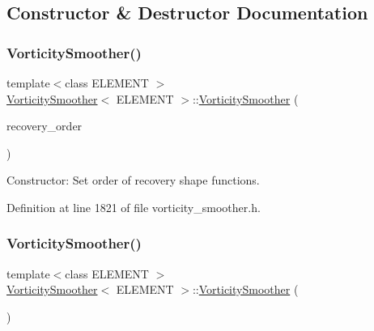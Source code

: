 \subsection{Constructor \& Destructor Documentation}
\mbox{\label{classVorticitySmoother_ae1c778ccf80298ff06ed89f581956b70}} 
\subsubsection{\texorpdfstring{Vorticity\+Smoother()}{VorticitySmoother()}\hspace{0.1cm}{\footnotesize\ttfamily [1/2]}}
{\footnotesize\ttfamily template$<$class E\+L\+E\+M\+E\+NT $>$ \\
\hyperlink{classVorticitySmoother}{Vorticity\+Smoother}$<$ E\+L\+E\+M\+E\+NT $>$\+::\hyperlink{classVorticitySmoother}{Vorticity\+Smoother} (\begin{DoxyParamCaption}\item[{const unsigned \&}]{recovery\+\_\+order }\end{DoxyParamCaption})\hspace{0.3cm}{\ttfamily [inline]}}



Constructor\+: Set order of recovery shape functions. 



Definition at line 1821 of file vorticity\+\_\+smoother.\+h.

\mbox{\label{classVorticitySmoother_a398982f6cd71421234850d34bed3e06f}} 
\subsubsection{\texorpdfstring{Vorticity\+Smoother()}{VorticitySmoother()}\hspace{0.1cm}{\footnotesize\ttfamily [2/2]}}
{\footnotesize\ttfamily template$<$class E\+L\+E\+M\+E\+NT $>$ \\
\hyperlink{classVorticitySmoother}{Vorticity\+Smoother}$<$ E\+L\+E\+M\+E\+NT $>$\+::\hyperlink{classVorticitySmoother}{Vorticity\+Smoother} (\begin{DoxyParamCaption}\item[{const \hyperlink{classVorticitySmoother}{Vorticity\+Smoother}$<$ E\+L\+E\+M\+E\+NT $>$ \&}]{ }\end{DoxyParamCaption})\hspace{0.3cm}{\ttfamily [inline]}}



